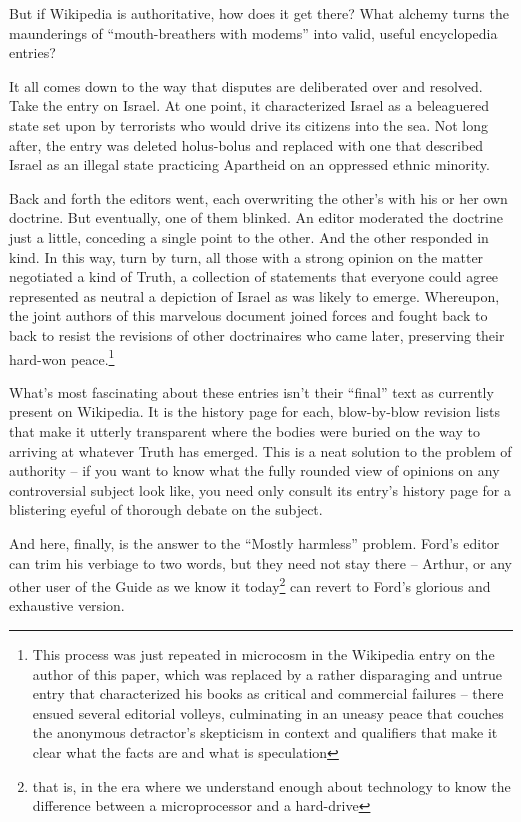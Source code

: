 But if Wikipedia is authoritative, how does it get there? What
alchemy turns the maunderings of ``mouth-breathers with modems'' into
valid, useful encyclopedia entries?

It all comes down to the way that disputes are deliberated over and
resolved. Take the entry on Israel. At one point, it characterized
Israel as a beleaguered state set upon by terrorists who would
drive its citizens into the sea. Not long after, the entry was
deleted holus-bolus and replaced with one that described Israel as
an illegal state practicing Apartheid on an oppressed ethnic
minority.

Back and forth the editors went, each overwriting the other's with
his or her own doctrine. But eventually, one of them blinked. An
editor moderated the doctrine just a little, conceding a single
point to the other. And the other responded in kind. In this way,
turn by turn, all those with a strong opinion on the matter
negotiated a kind of Truth, a collection of statements that
everyone could agree represented as neutral a depiction of Israel
as was likely to emerge. Whereupon, the joint authors of this
marvelous document joined forces and fought back to back to resist
the revisions of other doctrinaires who came later, preserving
their hard-won peace.\footnote{
  This process was just repeated in
  microcosm in the Wikipedia entry on the author of this paper, which
  was replaced by a rather disparaging and untrue entry that
  characterized his books as critical and commercial failures --
  there ensued several editorial volleys, culminating in an uneasy
  peace that couches the anonymous detractor's skepticism in context
  and qualifiers that make it clear what the facts are and what is
  speculation
}

What's most fascinating about these entries isn't their ``final''
text as currently present on Wikipedia. It is the history page for
each, blow-by-blow revision lists that make it utterly transparent
where the bodies were buried on the way to arriving at whatever
Truth has emerged. This is a neat solution to the problem of
authority -- if you want to know what the fully rounded view of
opinions on any controversial subject look like, you need only
consult its entry's history page for a blistering eyeful of
thorough debate on the subject.

And here, finally, is the answer to the ``Mostly harmless'' problem.
Ford's editor can trim his verbiage to two words, but they need not
stay there -- Arthur, or any other user of the Guide as we know it
today\footnote{
  that is, in the era where we understand enough about
  technology to know the difference between a microprocessor and a
  hard-drive}
can revert to Ford's glorious and exhaustive version.


